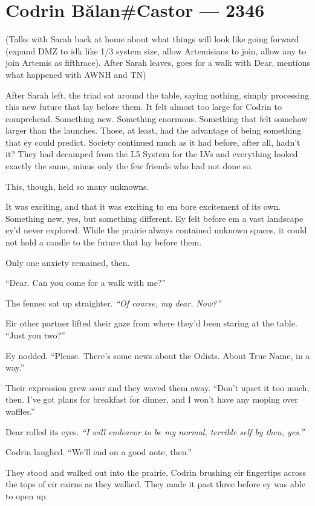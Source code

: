 \hypertarget{codrin-bux103lancastor-2346}{%
\chapter{Codrin Bălan\#Castor — 2346}\label{codrin-bux103lancastor-2346}}

(Talks with Sarah back at home about what things will look like going forward (expand DMZ to idk like 1/3 system size, allow Artemisians to join, allow any to join Artemis as fifthrace). After Sarah leaves, goes for a walk with Dear, mentions what happened with AWNH and TN)

After Sarah left, the triad sat around the table, saying nothing, simply processing this new future that lay before them. It felt almost too large for Codrin to comprehend. Something new. Something enormous. Something that felt somehow larger than the launches. Those, at least, had the advantage of being something that ey could predict. Society continued much as it had before, after all, hadn't it? They had decamped from the L5 System for the LVs and everything looked exactly the same, minus only the few friends who had not done so.

This, though, held so many unknowns.

It was exciting, and that it was exciting to em bore excitement of its own. Something new, yes, but something different. Ey felt before em a vast landscape ey'd never explored. While the prairie always contained unknown spaces, it could not hold a candle to the future that lay before them.

Only one anxiety remained, then.

``Dear. Can you come for a walk with me?''

The fennec sat up straighter. \emph{``Of course, my dear. Now?''}

Eir other partner lifted their gaze from where they'd been staring at the table. ``Just you two?''

Ey nodded. ``Please. There's some news about the Odists. About True Name, in a way.''

Their expression grew sour and they waved them away. ``Don't upset it too much, then. I've got plans for breakfast for dinner, and I won't have any moping over waffles.''

Dear rolled its eyes. \emph{``I will endeavor to be my normal, terrible self by then, yes.''}

Codrin laughed. ``We'll end on a good note, then.''

They stood and walked out into the prairie, Codrin brushing eir fingertips across the tops of eir cairns as they walked. They made it past three before ey was able to open up.

